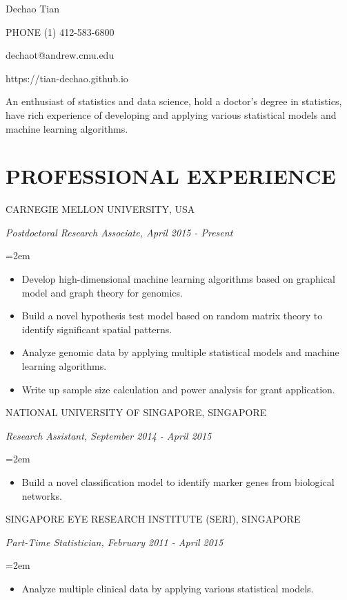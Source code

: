 \documentclass[paper=letter,fontsize=11pt]{scrartcl} %
\newcommand{\MyName}[3]{ %
    \Huge \usefont{OT1}{phv}{b}{n} \begin{center} #1 \end{center}  
         \normalsize \normalfont 
         \vspace{-10pt}
        \begin{minipage}[t]{0.47\textwidth} \begin{flushright} #2 \end{flushright} \end{minipage}
            \hfill
        \begin{minipage}[t]{0.47\textwidth} #3 \end{minipage} }
\newcommand{\MyNamelink}[4]{ %
    \Huge \usefont{OT1}{phv}{b}{n} \begin{center} #1 \end{center}  
         \normalsize \normalfont 
         \vspace{-10pt}
        \begin{minipage}[t]{0.30\textwidth} \begin{flushright} #2 \end{flushright} \end{minipage}
            \hfill
        \begin{minipage}[t]{0.30\textwidth} \begin{center} #3 \end{center} \end{minipage} 
            \hfill
        \begin{minipage}[t]{0.30\textwidth} #4 \end{minipage} 
            }
\newcommand{\MySlogan}[1]{ %
    \noindent \begin{center} #1 \end{center}
		\par \normalsize \normalfont}
\newcommand{\NewPart}[2]{\section*{\uppercase{#1} #2}}
\newcommand{\EducationEntry}[4]{
		\noindent \uppercase{#3}  \par  %
		\noindent \textit{#1, #2}         %
        \par }
\newcommand{\WorkEntry}[4]{				  %
		\noindent \uppercase{#1}  \par %
		\noindent \textit{#2, #3} \par %
        \noindent\hangindent=2em\hangafter=0 \small #4 %
		\normalsize \par}
\begin{document}
\thispagestyle{empty}



\MyNamelink{Dechao Tian}{PHONE (1) 412-583-6800}{dechaot@andrew.cmu.edu}{https://tian-dechao.github.io}

\vspace{8pt}
\MySlogan{An enthusiast of statistics and data science, hold a doctor's degree in statistics, have rich experience of developing and applying various statistical models and machine learning algorithms. }
\vspace{8pt}


\NewPart{Professional experience}{}
\WorkEntry{Carnegie Mellon University, USA}{Postdoctoral Research Associate}{April 2015 - Present} 
{\begin{itemize}
\item Develop high-dimensional machine learning algorithms based on graphical model and graph theory for genomics.
\item Build a novel hypothesis test model based on random matrix theory to identify significant spatial patterns.
\item Analyze genomic data by applying multiple statistical models and machine learning algorithms.
\item Write up sample size calculation and power analysis for grant application. 
\end{itemize}}
\WorkEntry{National University of Singapore, Singapore}{Research Assistant}{September 2014 - April 2015}{\begin{itemize} \item Build a novel classification model to identify marker genes from biological networks. \end{itemize}}
\WorkEntry{Singapore Eye Research Institute (SERI), Singapore}{Part-Time Statistician}{February 2011 - April 2015}{\begin{itemize} 
    \item Analyze multiple clinical data by applying various statistical models.  
\end{itemize}}
\end{document}
